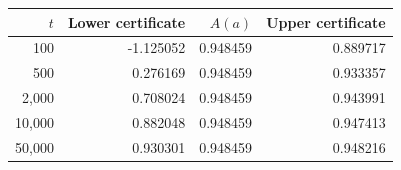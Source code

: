 \begin{tabular}{r r r r}
\toprule
$t$ & Lower certificate & $A(a)$ & Upper certificate\\
\midrule
100 & -1.125052 & 0.948459 & 0.889717\\
500 & 0.276169 & 0.948459 & 0.933357\\
2,000 & 0.708024 & 0.948459 & 0.943991\\
10,000 & 0.882048 & 0.948459 & 0.947413\\
50,000 & 0.930301 & 0.948459 & 0.948216\\
\bottomrule
\end{tabular}
